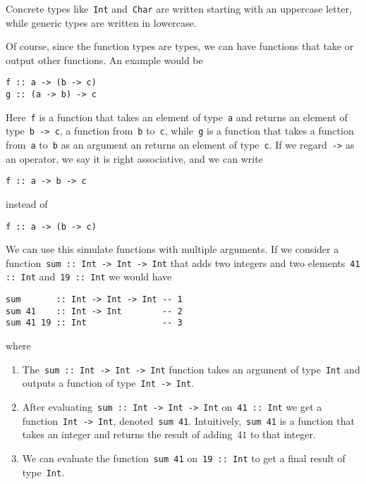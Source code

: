\documentclass[../TFG.tex]{subfiles}
\begin{document}
Concrete types like~\texttt{Int} and~\texttt{Char} are
written starting with an uppercase letter, while generic types are written in
lowercase.

Of course, since the function types are types, we can have functions that take
or output other functions. An example would be
\begin{verbatim}
f :: a -> (b -> c)
g :: (a -> b) -> c
\end{verbatim}
Here~\texttt{f} is a function that takes an element of
type~\texttt{a} and returns an element of
type~\texttt{b -> c}, \ie a function from~\texttt{b}
to~\texttt{c}, while~\texttt{g} is a function that
takes a function from~\texttt{a} to~\texttt{b} as an
argument an returns an element of type~\texttt{c}. If we
regard~\texttt{->} as an operator, we say it is right associative,
and we can write
\begin{verbatim}
f :: a -> b -> c
\end{verbatim}
instead of
\begin{verbatim}
f :: a -> (b -> c)
\end{verbatim}

We can use this simulate functions with multiple arguments.
If we consider a function~\texttt{sum :: Int -> Int -> Int} that
adds two integers and two elements~\texttt{41 :: Int}
and~\texttt{19 :: Int} we would have
\begin{verbatim}
sum       :: Int -> Int -> Int -- 1
sum 41    :: Int -> Int        -- 2
sum 41 19 :: Int               -- 3
\end{verbatim}
where
\begin{enumerate}
    \item The~\texttt{sum :: Int -> Int -> Int} function takes an
        argument of type~\texttt{Int} and outputs a function of
        type~\texttt{Int -> Int}.
    \item After evaluating~\texttt{sum :: Int -> Int -> Int}
        on~\texttt{41 :: Int} we get a
        function~\texttt{Int -> Int},
        denoted~\texttt{sum 41}.
        Intuitively,~\texttt{sum 41} is a function that takes an
        integer and returns the result of adding~\(41\) to that integer.
    \item We can evaluate the function~\texttt{sum 41}
        on~\texttt{19 :: Int} to get a final result of
        type~\texttt{Int}.
\end{enumerate}
\end{document}
